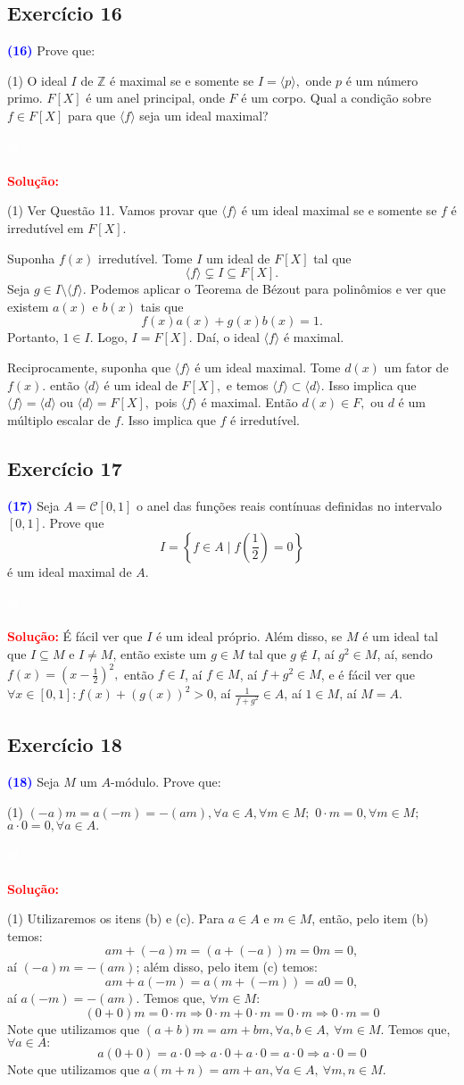 \documentclass[11pt,a4paper]{article}
\newcommand{\exercicio}[1]{\subsection{Exercício #1} \textcolor{blue}{\bf(#1)}}
\newcommand{\dividiritens}[1]{\begin{tasks}[counter-format={(tsk[a])},label-width=3.6ex, label-format = {\bfseries}, column-sep = {0pt}](1) #1 \end{tasks}}
\newcommand{\pers}[1]{\textcolor{Floresta}{$\negrito{(#1)} $}}
\newcommand{\solucao}[1]{
\textbf{\textcolor{white}{oi}\\ \\ \textcolor{red}{Solução:}} #1}
\begin{document}
\exercicio{16} Prove que: 
\dividiritens{
\task[\pers{a}] O ideal $I$ de $\mathbb{Z}$ é maximal se e somente se $I = \langle p \rangle,$ onde $p$ é um número primo.
\task[\pers{b}] $F[X]$ é um anel principal, onde $F$ é um corpo. Qual a condição sobre $f \in F[X]$ para que $\langle f \rangle$ seja um ideal maximal?
}
\solucao{
\dividiritens{
\task[\pers{a}] Ver Questão 11.
\task[\pers{b}] Vamos provar que $\langle f \rangle$ é um ideal maximal se e somente se $f$ é irredutível em $F[X].$

Suponha $f(x)$ irredutível. Tome $I$ um ideal de $F[X]$ tal que 
\[
\langle f \rangle \subsetneq I \subseteq F[X].
\]
Seja $g \in I \setminus \langle f \rangle.$ Podemos aplicar o Teorema de Bézout para polinômios e ver que existem $a(x)$ e $b(x)$ tais que
\[
f(x)a(x) + g(x)b(x) = 1.
\]
Portanto, $1 \in I.$ Logo, $I = F[X].$ Daí, o ideal $\langle f \rangle$ é maximal.

Reciprocamente, suponha que $\langle f \rangle$ é um ideal maximal. Tome $d(x)$ um fator de $f(x).$ então $\langle d \rangle$ é um ideal de $F[X],$ e temos $\langle f \rangle \subset \langle d \rangle.$ Isso implica que $\langle f \rangle = \langle d \rangle$ ou $\langle d \rangle = F[X],$ pois $\langle f \rangle$ é maximal. Então $d(x) \in F,$ ou $d$ é um múltiplo escalar de $f.$ Isso implica que $f$ é irredutível.
}
}
\exercicio{17} Seja $A = \mathcal{C}[0, 1]$ o anel das funções reais contínuas definidas no intervalo $[0, 1].$ Prove que 
\[I = \left\{f \in A \mid f \left(\frac{1}{2} \right) = 0 \right\}\]
é um ideal maximal de $A.$ 
\solucao{
É fácil ver que $I$ é um ideal próprio. Além disso, se $M$ é um ideal tal que $I\subseteq M$ e $I\neq M$, então existe um $g\in M$ tal que $g\notin I$, aí $g^2\in M$, aí, sendo $f(x)=\left(x-\frac{1}{2}\right)^2,$ então $f\in I$, aí $f\in M$, aí $f+g^2\in M$, e é fácil ver que $\forall x\in[0,1]:f(x)+(g(x))^2>0$, aí $\frac{1}{f+g^2}\in A$, aí $1\in M$, aí $M=A$.
}
\exercicio{18} Seja $M$ um $A$-módulo. Prove que:
\dividiritens{
\task[\pers{a}] $(-a)m = a(-m) = -(am), \forall a \in A, \forall m \in M;$
\task[\pers{b}] $0 \cdot m = 0, \forall m \in M;$
\task[\pers{c}] $a \cdot 0 = 0, \forall a \in A.$
}
\solucao{
\dividiritens{
\task[\pers{a}] Utilizaremos os itens (b) e (c). Para $a\in A$ e $m\in M$, então, pelo item (b) temos:
\[
am+(-a)m=(a+(-a))m=0m=0,
\]
aí $(-a)m=-(am)$; além disso, pelo item (c) temos:
\[
am+a(-m)=a(m+(-m))=a0=0,
\]
aí $a(-m)=-(am)$.
\task[\pers{b}] Temos que, $\forall m \in M:$
\[
(0+0)m = 0 \cdot m \Rightarrow 0 \cdot m + 0 \cdot m = 0 \cdot m \Rightarrow 0 \cdot m = 0
\]
Note que utilizamos que $(a+b)m = am + bm, \forall a,b \in A, \ \forall m \in M.$
\task[\pers{c}] Temos que, $\forall a \in A:$
\[
a(0+0) = a \cdot 0 \Rightarrow a \cdot 0 + a \cdot 0 = a \cdot 0  \Rightarrow a \cdot 0 = 0
\]
Note que utilizamos que $a(m+n) = am + an, \forall a \in A, \ \forall m,n \in M.$
}
}
\end{document}
